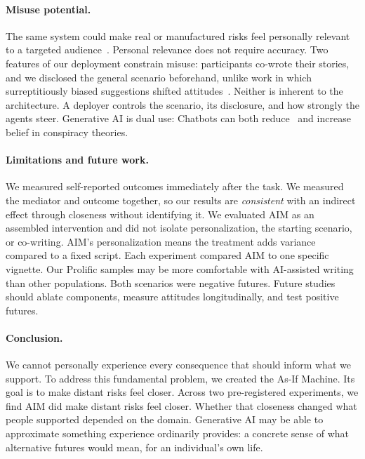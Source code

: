 \documentclass[11pt]{article}
\begin{document}
\paragraph{Misuse potential.} The same system could make real or manufactured risks feel personally relevant to a targeted audience~\cite{matz_potential_2024}. Personal relevance does not require accuracy. Two features of our deployment constrain misuse: participants co-wrote their stories, and we disclosed the general scenario beforehand, unlike work in which surreptitiously biased suggestions shifted attitudes~\citep{jakesch_co-writing_2023}. Neither is inherent to the architecture. A deployer controls the scenario, its disclosure, and how strongly the agents steer. Generative AI is   dual use: Chatbots can both reduce~\citep{costello_durably_2024} and increase~\citep{costello_large_2026} belief in conspiracy theories.


\paragraph{Limitations and future work.} We measured self-reported outcomes immediately after the task. We measured the mediator and outcome together, so our results are \textit{consistent} with an indirect effect through closeness without identifying it. We evaluated AIM as an assembled intervention and did not isolate personalization, the starting scenario, or co-writing. AIM's personalization means the treatment adds variance compared to a fixed script. Each experiment compared AIM to one specific vignette. Our Prolific samples may be more comfortable with AI-assisted writing than other populations. Both scenarios were negative futures. Future studies should ablate components, measure attitudes longitudinally, and test positive futures.

\paragraph{Conclusion.} We cannot personally experience every consequence that should inform what we support. To address this fundamental problem, we created the As-If Machine. Its goal is to make distant risks feel closer. Across two pre-registered experiments, we find AIM did make distant risks feel closer. Whether that closeness changed what people supported depended on the domain. Generative AI may be able to approximate something experience ordinarily provides: a concrete sense of what alternative futures would mean, for an individual's own life.
\end{document}
